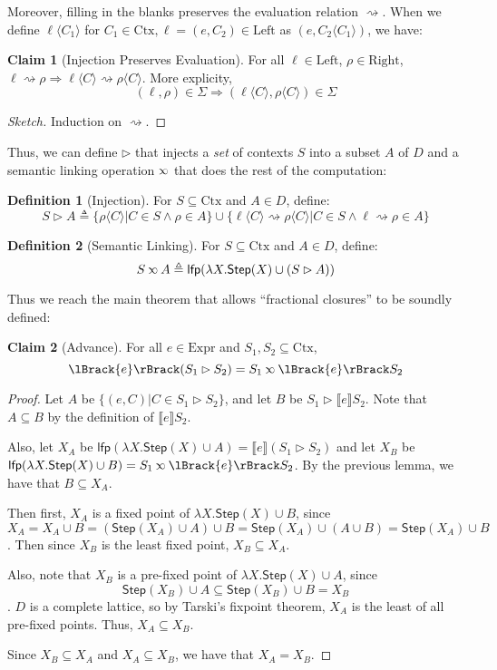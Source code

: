 \documentclass{article}
\theoremstyle{definition}
\newtheorem{definition}{Definition}[section]
\newtheorem{clm}{Claim}[section]
\newcommand*{\Expr}{\text{Expr}}
\newcommand*{\Ctx}{\text{Ctx}}
\newcommand*{\Left}{\text{Left}}
\newcommand*{\Right}{\text{Right}}
\newcommand*{\lfp}{\mathsf{lfp}}
\newcommand*{\Step}{\mathsf{Step}}
\newcommand*{\semarrow}{\rightsquigarrow}
\newcommand*{\semlink}{\mathbin{\rotatebox[origin=c]{180}{$\propto$}}}
\newcommand*{\sembracket}[1]{\lBrack{#1}\rBrack}
\newcommand*{\inject}[2]{{#2}\langle{#1}\rangle}
\begin{document}
Moreover, filling in the blanks preserves the evaluation relation $\semarrow$.
When we define $\inject{C_1}{\ell}$ for $C_1\in\Ctx,\ell=(e,C_2)\in\Left$ as $(e,\inject{C_1}{C_2})$, we have:
\begin{clm}[Injection Preserves Evaluation]
  For all $\ell\in\Left$, $\rho\in\Right$, $\ell\semarrow\rho\Rightarrow\inject{C}{\ell}\semarrow\inject{C}{\rho}$. More explicity,
  \[(\ell,\rho)\in\Sigma\Rightarrow(\inject{C}{\ell},\inject{C}{\rho})\in\Sigma\]
\end{clm}
\begin{proof}[Sketch]
  Induction on $\semarrow$.
\end{proof}

Thus, we can define $\rhd$ that injects a \emph{set} of contexts $S$ into a subset $A$ of $D$ and a semantic linking operation $\semlink$ that does the rest of the computation:
\begin{definition}[Injection]
  For $S\subseteq\Ctx$ and $A\in D$, define:
  \[S\rhd A\triangleq\{\inject{C}{\rho}|C\in S\wedge\rho\in A\}\cup\{\inject{C}{\ell}\semarrow\inject{C}{\rho}|C\in S\wedge\ell\semarrow\rho\in A\}\]
\end{definition}
\begin{definition}[Semantic Linking]
  For $S\subseteq\Ctx$ and $A\in D$, define:
  \[S\semlink A\triangleq\lfp(\lambda X.\Step(X)\cup(S\rhd A))\]
\end{definition}

Thus we reach the main theorem that allows ``fractional closures'' to be soundly defined:
\begin{clm}[Advance]
  For all $e\in\Expr$ and $S_1,S_2\subseteq\Ctx$,
  \[\sembracket{e}(S_1\rhd S_2)=S_1\semlink\sembracket{e}S_2\]
\end{clm}
\begin{proof}
  Let $A$ be $\{(e,C)|C\in S_1\rhd S_2\}$, and let $B$ be $S_1\rhd\sembracket{e}S_2$.
  Note that $A\subseteq B$ by the definition of $\sembracket{e}S_2$.

  Also, let $X_A$ be $\lfp(\lambda X.\Step(X)\cup A)=\sembracket{e}(S_1\rhd S_2)$ and let $X_B$ be $\lfp(\lambda X.\Step(X)\cup B)=S_1\semlink\sembracket{e}S_2$.
  By the previous lemma, we have that $B\subseteq X_A$.

  Then first, $X_A$ is a fixed point of $\lambda X.\Step(X)\cup B$, since
  \[X_A=X_A\cup B=(\Step(X_A)\cup A)\cup B=\Step(X_A)\cup(A\cup B)=\Step(X_A)\cup B\]
  . Then since $X_B$ is the least fixed point, $X_B\subseteq X_A$.

  Also, note that $X_B$ is a pre-fixed point of $\lambda X.\Step(X)\cup A$, since
  \[\Step(X_B)\cup A\subseteq\Step(X_B)\cup B=X_B\]
  . $D$ is a complete lattice, so by Tarski's fixpoint theorem, $X_A$ is the least of all pre-fixed points.
  Thus, $X_A\subseteq X_B$.

  Since $X_B\subseteq X_A$ and $X_A\subseteq X_B$, we have that $X_A=X_B$.
\end{proof}
\end{document}
